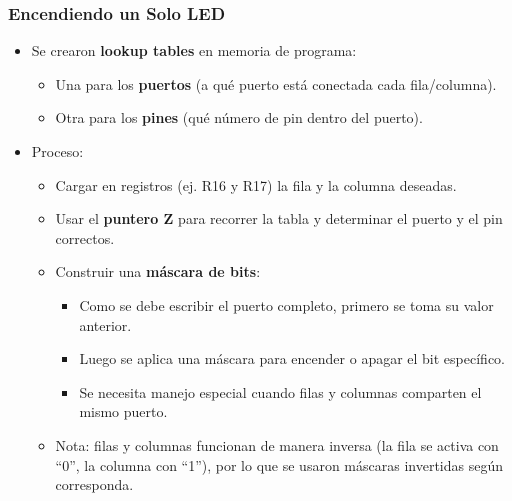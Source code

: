\subsubsection{Encendiendo un Solo LED}
\begin{itemize}[leftmargin=2em]
    \item Se crearon \textbf{lookup tables} en memoria de programa:
    \begin{itemize}
        \item Una para los \textbf{puertos} (a qué puerto está conectada cada fila/columna).
        \item Otra para los \textbf{pines} (qué número de pin dentro del puerto).
    \end{itemize}
    \item Proceso:
    \begin{itemize}
        \item Cargar en registros (ej. R16 y R17) la fila y la columna deseadas.
        \item Usar el \textbf{puntero Z} para recorrer la tabla y determinar el puerto y el pin correctos.
        \item Construir una \textbf{máscara de bits}:
        \begin{itemize}
            \item Como se debe escribir el puerto completo, primero se toma su valor anterior.
            \item Luego se aplica una máscara para encender o apagar el bit específico.
            \item Se necesita manejo especial cuando filas y columnas comparten el mismo puerto.
        \end{itemize}
        \item Nota: filas y columnas funcionan de manera inversa (la fila se activa con ``0'', la columna con ``1''), por lo que se usaron máscaras invertidas según corresponda.
    \end{itemize}
\end{itemize}


